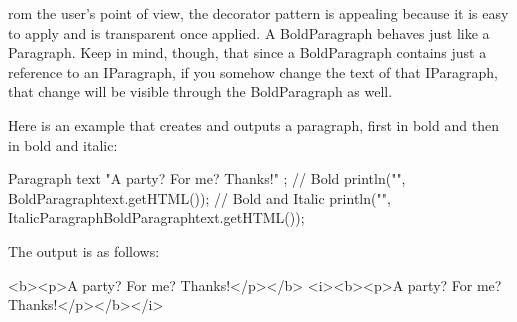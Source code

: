 
rom the user’s point of view, the decorator pattern is appealing because it is easy to apply and is transparent once applied. A BoldParagraph behaves just like a Paragraph. Keep in mind, though, that since a BoldParagraph contains just a reference to an IParagraph, if you somehow change the text of that IParagraph, that change will be visible through the BoldParagraph as well.

Here is an example that creates and outputs a paragraph, first in bold and then in bold and italic:

\begin{cpp}
Paragraph text { "A party? For me? Thanks!" };
// Bold
println("{}", BoldParagraph{text}.getHTML());
// Bold and Italic
println("{}", ItalicParagraph{BoldParagraph{text}}.getHTML());
\end{cpp}

The output is as follows:

\begin{shell}
<b><p>A party? For me? Thanks!</p></b>
<i><b><p>A party? For me? Thanks!</p></b></i>
\end{shell}

















